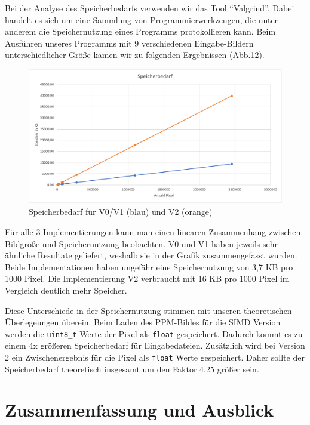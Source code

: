 \documentclass[course=erap]{aspdoc}
\begin{document}
\par
Bei der Analyse des Speicherbedarfs verwenden wir das Tool “Valgrind”. Dabei handelt es sich um eine Sammlung von Programmierwerkzeugen, die unter anderem die Speichernutzung eines Programms protokollieren kann. Beim Ausführen unseres Programms mit 9 verschiedenen Eingabe-Bildern unterschiedlicher Größe kamen wir zu folgenden Ergebnissen (Abb.12).

\begin{figure}[h]
\centering
\includegraphics[width=1\textwidth]{Bilder/Speicherbedarf2.png}
\caption{Speicherbedarf für V0/V1 (blau) und V2 (orange)}
\end{figure}

\par
Für alle 3 Implementierungen kann man einen linearen Zusammenhang zwischen Bildgröße und Speichernutzung beobachten. V0 und V1 haben jeweils sehr ähnliche Resultate geliefert, weshalb sie in der Grafik zusammengefasst wurden. Beide Implementationen haben ungefähr eine Speichernutzung von 3,7 KB pro 1000 Pixel. Die Implementierung V2 verbraucht mit 16 KB pro 1000 Pixel im Vergleich deutlich mehr Speicher.

\par
Diese Unterschiede in der Speichernutzung stimmen mit unseren theoretischen Überlegeungen überein. Beim Laden des PPM-Bildes für die SIMD Version werden die \texttt{uint8\_t}-Werte der Pixel als \texttt{float} gespeichert. Dadurch kommt es zu einem 4x größeren Speicherbedarf für Eingabedateien. Zusätzlich wird bei Version 2 ein Zwischenergebnis für die Pixel als \texttt{float} Werte gespeichert. Daher sollte der Speicherbedarf theoretisch insgesamt um den Faktor 4,25 größer sein. 

\section{Zusammenfassung und Ausblick}
\end{document}
